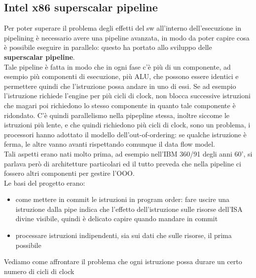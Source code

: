 \documentclass[14pt, oneside]{book}
\begin{document}
\subsection{Intel x86 superscalar pipeline}
Per poter superare il problema degli effetti del sw all'interno dell'esecuzione in pipelining è necessario avere una  pipeline avanzata, in modo da poter capire cosa è possibile eseguire in parallelo: questo ha portato allo sviluppo delle \textbf{superscalar pipeline}.\\  Tale pipeline è fatta in modo che in ogni fase c'è più di un componente, ad esempio più componenti di esecuzione, più ALU, che possono essere identici e permettere quindi che l'istruzione possa andare in uno di essi. Se ad esempio l'istruzione richiede l'engine per più cicli di clock, non blocca successive istruzioni che magari poi richiedono lo stesso componente in quanto tale componente è ridondato. C'è quindi parallelismo nella pipepline stessa, inoltre siccome le istruzioni più lente, e che quindi richiedono più cicli di clock, sono un problema, i processori hanno adottato il modello dell'out-of-ordering: se qualche istruzione è ferma, le altre vanno avanti rispettando comunque il data flow model.\\ Tali aspetti erano nati molto prima, ad esempio nell'IBM 360/91 degli anni 60', si parlava però di architetture particolari ed il tutto preveda che nella pipeline ci fossero altri componenti per gestire l'OOO.\\ Le basi del progetto erano:
\begin{itemize}
\item come mettere in commit le istruzioni in program order: fare uscire una istruzione dalla pipe indica che l'effetto dell'istruzione sulle risorse dell'ISA divine visibile, quindi è delicato capire quando mandare in commit
\item processare istruzioni indipendenti, sia sui dati che sulle risorse, il prima possibile
\end{itemize}
Vediamo come affrontare il problema che ogni istruzione possa durare un certo numero di cicli di clock
\end{document}
